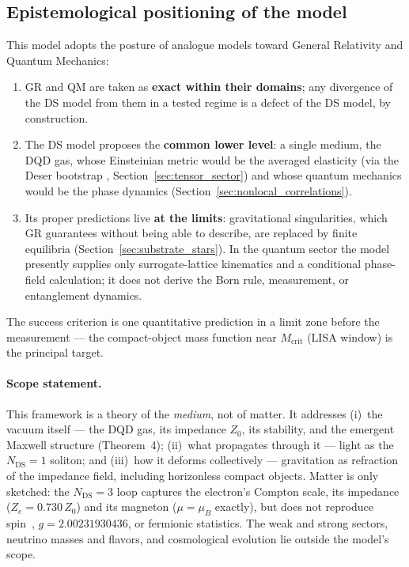 \documentclass[11pt,a4paper]{article}
\theoremstyle{plain}
\theoremstyle{remark}
\newcommand{\Ncd}{\ensuremath{N_{\mathrm{DS}}}}
\begin{document}
\subsection*{Epistemological positioning of the model}
This model adopts the posture of analogue models \cite{barcelo, volovik} toward General Relativity and Quantum Mechanics:
\begin{enumerate}[label=(\roman*)]
    \item GR and QM are taken as \textbf{exact within their domains}; any divergence of the DS model from them in a tested regime is a defect of the DS model, by construction.
    \item The DS model proposes the \textbf{common lower level}: a single medium, the DQD gas, whose Einsteinian metric would be the averaged elasticity (via the Deser bootstrap \cite{deser1970}, Section~\ref{sec:tensor_sector}) and whose quantum mechanics would be the phase dynamics (Section~\ref{sec:nonlocal_correlations}).
    \item Its proper predictions live \textbf{at the limits}: gravitational singularities, which GR guarantees without being able to describe, are replaced by finite equilibria (Section~\ref{sec:substrate_stars}). In the quantum sector the model presently supplies only surrogate-lattice kinematics and a conditional phase-field calculation; it does not derive the Born rule, measurement, or entanglement dynamics.
\end{enumerate}
The success criterion is one quantitative prediction in a limit zone before the measurement --- the compact-object mass function near $M_{\text{crit}}$ (LISA window) is the principal target.

\paragraph{Scope statement.} This framework is a theory of the \emph{medium}, not of matter. It addresses (i)~the vacuum itself --- the DQD gas, its impedance $Z_0$, its stability, and the emergent Maxwell structure (Theorem~4); (ii)~what propagates through it --- light as the $\Ncd=1$ soliton; and (iii)~how it deforms collectively --- gravitation as refraction of the impedance field, including horizonless compact objects. Matter is only sketched: the $\Ncd=3$ loop captures the electron's Compton scale, its impedance ($Z_e = 0.730\,Z_0$) and its magneton ($\mu = \mu_B$ exactly), but does not reproduce spin~\textonehalf, $g = 2.00231930436$, or fermionic statistics. The weak and strong sectors, neutrino masses and flavors, and cosmological evolution lie outside the model's scope.
\end{document}
